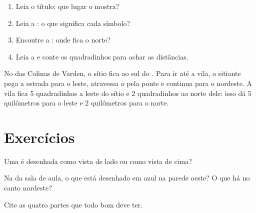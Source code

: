 
\begin{method}\label{met:g2:drawing-to-map:read}
\begin{enumerate}
  \item Leia o título: que lugar o  mostra?
  \item Leia a : o que significa cada símbolo?
  \item Encontre a : onde fica o norte?
  \item Leia a  e conte os quadradinhos para achar as distâncias.
\end{enumerate}
\end{method}

\begin{example}\label{ex:g2:drawing-to-map:farm}
No  das Colinas de Varden, o sítio fica ao sul do . Para ir até a vila,
o sitiante pega a estrada para o leste, atravessa o  pela ponte e
continua para o nordeste. A vila fica 5 quadradinhos a leste do sítio e 2
quadradinhos ao norte dele: isso dá 5 quilômetros para o leste e 2
quilômetros para o norte.
\end{example}

\section{Exercícios}

\begin{exercise}[$\star$]\label{exo:g2:drawing-to-map:1}
Uma  é desenhada como vista de lado ou como vista de cima?
\end{exercise}

\begin{exercise}[$\star$]\label{exo:g2:drawing-to-map:2}
Na  da sala de aula, o que está desenhado em azul na parede oeste? O
que há no canto nordeste?
\end{exercise}

\begin{exercise}[$\star$]\label{exo:g2:drawing-to-map:3}
Cite as quatro partes que todo bom  deve ter.
\end{exercise}

